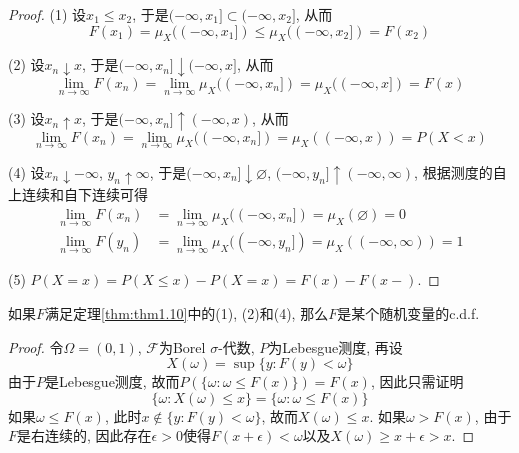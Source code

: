 \documentclass[cn, 12pt, math=mtpro2, bibstyle=apa, blue, twocol]{elegantbook}
\newcommand{\F}{\mathcal{F}}
\newcommand{\PP}{P}
\newcommand{\limn}{\lim_{n\to\infty}}
\let\emptyset\varnothing
\begin{document}
\begin{proof}
  (1) 设$x_1\leq x_2$, 于是$(-\infty,x_1]\subset (-\infty,x_2]$, 从而
  $$F(x_1)=\mu_X((-\infty,x_1])\leq\mu_X((-\infty,x_2])=F(x_2)$$

  (2) 设$x_n\downarrow x$, 于是$(-\infty,x_n]\downarrow (-\infty,x]$, 从而
  $$\limn F(x_n)=\limn \mu_X((-\infty,x_n])=\mu_X((-\infty,x])=F(x)$$

  (3) 设$x_n\uparrow x$, 于是$(-\infty,x_n]\uparrow (-\infty,x)$, 从而
  $$\limn F(x_n)=\limn \mu_X((-\infty,x_n])=\mu_X((-\infty,x))=\PP(X<x)$$

  (4) 设$x_n\downarrow -\infty$, $y_n\uparrow \infty$, 于是$(-\infty,x_n]\downarrow \emptyset$, $(-\infty,y_n]\uparrow (-\infty,\infty)$, 根据测度的自上连续和自下连续可得
  \begin{align*}
  \lim_{n\to\infty}F(x_n)&=\limn\mu_X((-\infty,x_n])=\mu_X(\emptyset)=0 \\
  \limn F(y_n)&=\limn \mu_X((-\infty,y_n])=\mu_X((-\infty,\infty))=1
  \end{align*}

  (5) $\PP(X=x)=\PP(X\leq x)-\PP(X=x)=F(x)-F(x-)$.

\end{proof}
\begin{theorem}\label{thm:thm1.11}
  如果$F$满足定理\ref{thm:thm1.10}中的(1), (2)和(4), 那么$F$是某个随机变量的c.d.f.
\end{theorem}
\begin{proof}
  令$\Omega=(0,1)$, $\F$为Borel $\sigma$-代数, $\PP$为Lebesgue测度, 再设
  $$X(\omega)=\sup\{y:F(y)<\omega \}$$
  由于$\PP$是Lebesgue测度, 故而$\PP(\{\omega: \omega\leq F(x)\})=F(x)$, 因此只需证明
  \begin{equation}\label{eq1.10}
    \{\omega:X(\omega)\leq x\}=\{\omega:\omega\leq F(x)\}
  \end{equation}
  如果$\omega\leq F(x)$, 此时$x\notin\{y:F(y)<\omega\}$, 故而$X(\omega)\leq x$. 如果$\omega>F(x)$, 由于$F$是右连续的, 因此存在$\epsilon>0$使得$F(x+\epsilon)<\omega$以及$X(\omega)\geq x+\epsilon>x$.
\end{proof}
\end{document}
